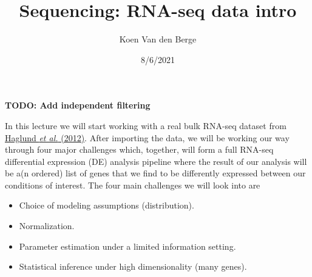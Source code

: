 \documentclass[ignorenonframetext,]{beamer}
\title{Sequencing: RNA-seq data intro}
\author{Koen Van den Berge}
\date{8/6/2021}
\providecommand{\tightlist}{%
  \setlength{\itemsep}{0pt}\setlength{\parskip}{0pt}}
\begin{document}
\frame{\titlepage}

\begin{frame}

\textbf{TODO: Add independent filtering}

In this lecture we will start working with a real bulk RNA-seq dataset
from
\href{https://academic.oup.com/jcem/article/97/12/4631/2536573}{Haglund
\emph{et al.} (2012)}. After importing the data, we will be working our
way through four major challenges which, together, will form a full
RNA-seq differential expression (DE) analysis pipeline where the result
of our analysis will be a(n ordered) list of genes that we find to be
differently expressed between our conditions of interest. The four main
challenges we will look into are

\begin{itemize}
\tightlist
\item
  Choice of modeling assumptions (distribution).
\item
  Normalization.
\item
  Parameter estimation under a limited information setting.
\item
  Statistical inference under high dimensionality (many genes).
\end{itemize}

\end{frame}
\end{document}
